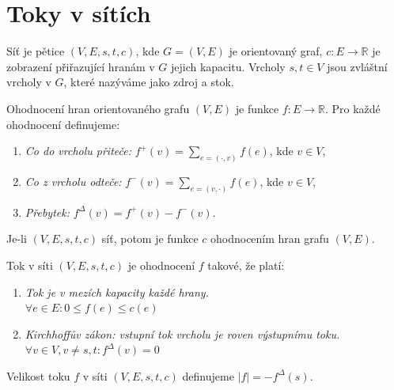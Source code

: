 \section{Toky v sítích}
\begin{t_definition}
  Síť je pětice $(V, E, s, t, c)$, kde $G=(V,E)$ je orientovaný graf, $c:E\rightarrow\mathbb{R}$ je zobrazení přiřazující hranám v $G$ jejich kapacitu. Vrcholy $s,t\in V$ jsou zvláštní vrcholy v $G$, které nazýváme jako zdroj a stok.
\end{t_definition}

\begin{t_definition}
  Ohodnocení hran orientovaného grafu $(V,E)$ je funkce $f:E\rightarrow\mathbb{R}$. Pro každé ohodnocení definujeme:
  \begin{enumerate}
    \item \textit{Co do vrcholu přiteče:} $f^+(v)=\sum_{e=(\cdot,v)} f(e)$, kde $v\in V$,
    \item \textit{Co z vrcholu odteče:} $f^-(v)=\sum_{e=(v,\cdot)} f(e)$, kde $v\in V$,
    \item \textit{Přebytek:} $f^\Delta(v)=f^+(v)-f^-(v)$.
  \end{enumerate}
\end{t_definition}

\begin{t_observation}
  Je-li $(V, E, s, t, c)$ síť, potom je funkce $c$ ohodnocením hran grafu $(V,E)$.
\end{t_observation}

\begin{t_definition}
  Tok v síti $(V, E, s, t, c)$ je ohodnocení $f$ takové, že platí:
  \begin{enumerate}
    \item
    \textit{Tok je v mezích kapacity každé hrany.}\\
    $\forall e\in E : 0\leq f(e) \leq c(e)$
    
    \item
    \textit{Kirchhoffův zákon: vstupní tok vrcholu je roven výstupnímu toku.}\\
    $\forall v\in V, v\neq s, t : f^\Delta(v)=0$
  \end{enumerate}
\end{t_definition}

\begin{t_definition}
  Velikost toku $f$ v síti $(V, E, s, t, c)$ definujeme $|f|=-f^\Delta(s)$.
\end{t_definition}

